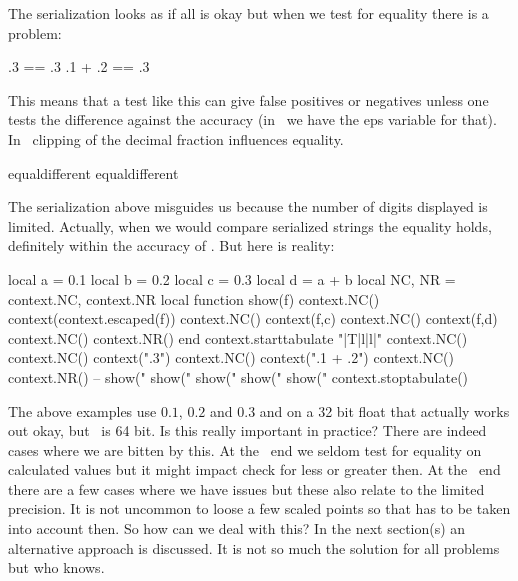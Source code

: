 The serialization looks as if all is okay but when we test for equality there
is a problem:

\starttabulate[|Tr|l|]
\NC      .3 == .3 \NC {} \NC \NR
\NC .1 + .2 == .3 \NC {} \NC \NR
\stoptabulate

This means that a test like this can give false positives or negatives unless one
tests the difference against the accuracy (in \METAPOST\ we have the {eps}
variable for that). In \TEX\ clipping of the decimal fraction influences equality.

\starttabulate[|Tr|l|]
\NC {} \NC {} equal\else different\fi \NC \NR
\NC {} \NC {} equal\else different\fi \NC \NR
\stoptabulate

The serialization above misguides us because the number of digits displayed is
limited. Actually, when we would compare serialized strings the equality holds,
definitely within the accuracy of \TEX. But here is reality:

\startluacode
    local a = 0.1
    local b = 0.2
    local c = 0.3
    local d = a + b
    local NC, NR = context.NC, context.NR
    local function show(f)
        context.NC() context(context.escaped(f))
        context.NC() context(f,c)
        context.NC() context(f,d)
        context.NC() context.NR()
    end
    context.starttabulate { "|T|l|l|" }
        context.NC()
        context.NC() context(".3")
        context.NC() context(".1 + .2")
        context.NC() context.NR()
     -- show("%
        show("%
        show("%
        show("%
        show("%
    context.stoptabulate()
\stopluacode

The above examples use $0.1$, $0.2$ and $0.3$ and on a 32 bit float that actually
works out okay, but \LUAMETATEX\ is 64 bit. Is this really important in practice?
There are indeed cases where we are bitten by this. At the \LUA\ end we seldom
test for equality on calculated values but it might impact check for less or
greater then. At the \TEX\ end there are a few cases where we have issues but
these also relate to the limited precision. It is not uncommon to loose a few
scaled points so that has to be taken into account then. So how can we deal with
this? In the next section(s) an alternative approach is discussed. It is not so
much the solution for all problems but who knows.

\stopsectionlevel

